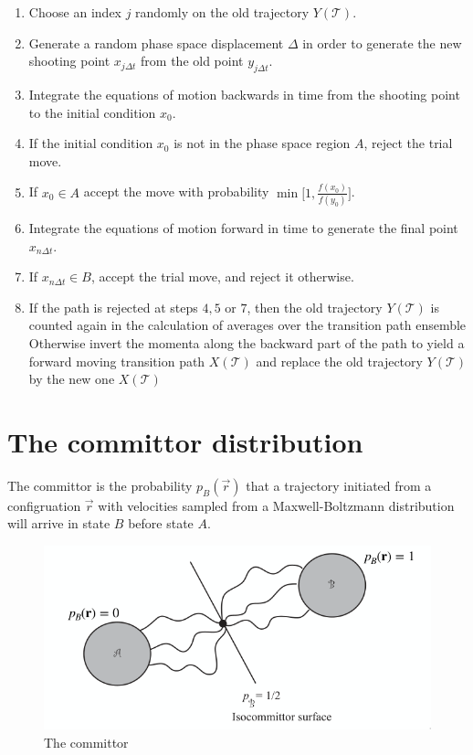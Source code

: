 	\begin{enumerate}
		\item Choose an index $j$ randomly on the old trajectory $Y(\mathcal{T})$.
		\item Generate a random phase space displacement $\Delta$ in order to generate the new shooting point $x_{j\Delta t}$ from the old point $y_{j\Delta t}$.
		\item Integrate the equations of motion backwards in time from the shooting point to the initial condition $x_0$.
		\item If the initial condition $x_0$ is not in the phase space region $A$, reject the trial move.
		\item If $x_0\in A$ accept the move with probability $\min\biggl[1,\frac{f(x_0)}{f(y_0)}\biggr]$.
		\item Integrate the equations of motion forward in time to generate the final point $x_{n\Delta t}$.
		\item If $x_{n\Delta t}\in B$, accept the trial move, and reject it otherwise.
		\item If the path is rejected at steps $4, 5$ or $7$, then the old trajectory $Y(\mathcal{T})$ is counted again in the calculation of averages over the transition path ensemble
			Otherwise invert the momenta along the backward part of the path to yield a forward moving transition path $X(\mathcal{T})$ and replace the old trajectory $Y(\mathcal{T})$ by the new one $X(\mathcal{T})$
	\end{enumerate}

\section{The committor distribution}
The committor is the probability $p_B(\vec{r})$ that a trajectory initiated from a configruation $\vec{r}$ with velocities sampled from a Maxwell-Boltzmann distribution will arrive in state $B$ before state $A$.

\begin{figure}[H]
	\includegraphics[width=\textwidth]{committor-distribution}
	\caption{The committor}
	\label{fig:committor-distribution}
\end{figure}

